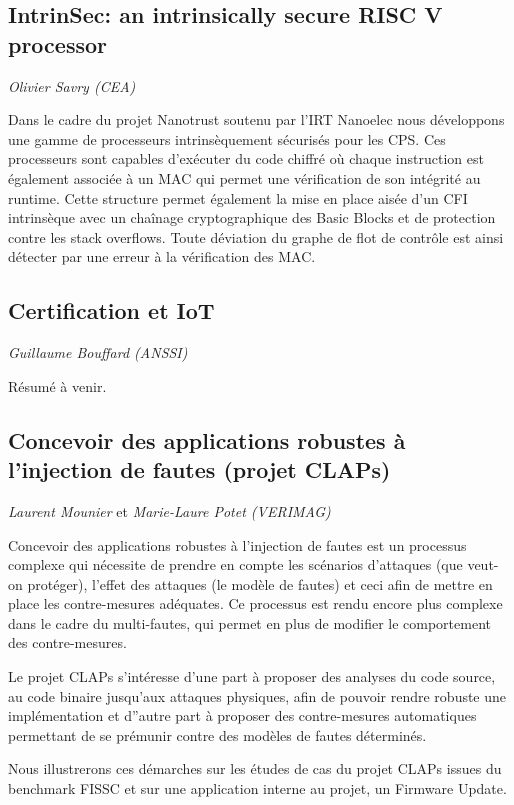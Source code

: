 \documentclass[a4paper,11pt]{article}
\begin{document}
\subsection{IntrinSec: an intrinsically secure RISC V processor}
\label{sec:org05922c6}
\emph{Olivier Savry (CEA)}

Dans le cadre du projet Nanotrust soutenu par l’IRT Nanoelec nous
développons une gamme de processeurs intrinsèquement sécurisés pour
les CPS. Ces processeurs sont capables d’exécuter du code chiffré où
chaque instruction est également associée à un MAC qui permet une
vérification de son intégrité au runtime. Cette structure permet
également la mise en place aisée d’un CFI intrinsèque avec un chaînage
cryptographique des Basic Blocks et de protection contre les stack
overflows. Toute déviation du graphe de flot de contrôle est ainsi
détecter par une erreur à la vérification des MAC.

\subsection{Certification et IoT}
\label{sec:org2f6ee07}
\emph{Guillaume Bouffard (ANSSI)}

Résumé à venir.

\subsection{Concevoir des applications robustes à l'injection de fautes (projet CLAPs)}
\label{sec:orgdae411e}
\emph{Laurent Mounier} et \emph{Marie-Laure Potet (VERIMAG)}

Concevoir des applications robustes à l'injection de fautes est un
processus complexe qui nécessite de prendre en compte les scénarios
d'attaques (que veut-on protéger), l'effet des attaques (le modèle de
fautes) et ceci afin de mettre en place les contre-mesures
adéquates. Ce processus est rendu encore plus complexe dans le cadre
du multi-fautes, qui permet en plus de modifier le comportement des
contre-mesures.

Le projet CLAPs s'intéresse d'une part à proposer des analyses du code
source, au code binaire jusqu'aux attaques physiques, afin de pouvoir
rendre robuste une implémentation et d''autre part à proposer des
contre-mesures automatiques permettant de se prémunir contre des
modèles de fautes déterminés.

Nous illustrerons ces démarches sur les études de cas du projet CLAPs
issues du benchmark FISSC et sur une application interne au projet, un
Firmware Update.
\end{document}
